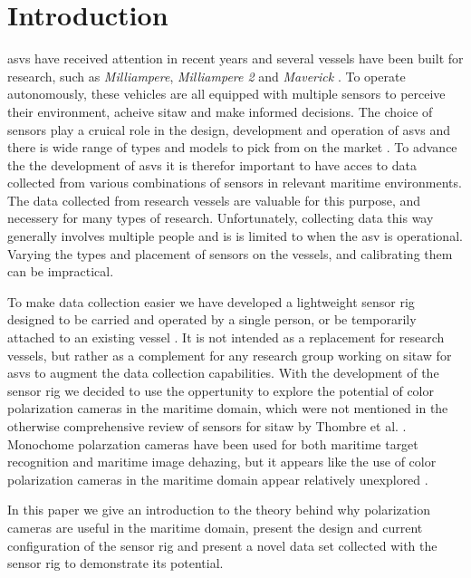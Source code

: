 \section{Introduction}
\glspl{asv} have received attention in recent years and several vessels have been built for research, such as \textit{Milliampere}, \textit{Milliampere 2} and \textit{Maverick} \cite{brekkeMilliAmpereAutonomousFerry2022}\cite{zhangDesignBuildAutonomous2023}\cite{eideAutonomousUrbanPassenger2024}.
To operate autonomously, these vehicles are all equipped with multiple sensors to perceive their environment, acheive \gls{sitaw} and make informed decisions.
The choice of sensors play a cruical role in the design, development and operation of \glspl{asv} and there is wide range of types and models to pick from on the market \cite{thombreSensorsAITechniques2022}.
To advance the the development of \glspl{asv} it is therefor important to have acces to data collected from various combinations  of sensors in relevant maritime environments.
The data collected from research vessels are valuable for this purpose, and necessery for many types of research.
Unfortunately, collecting data this way generally involves multiple people and is is limited to when the \gls{asv} is operational.
Varying the types and placement of sensors on the vessels, and calibrating them can be impractical.

To make data collection easier we have developed a lightweight sensor rig designed to be carried and operated by a single person, or be temporarily attached to an existing vessel \cite{martensPavingWayEnhanced2023}.
It is not intended as a replacement for research vessels, but rather as a complement for any research group working on \gls{sitaw} for \glspl{asv} to augment the data collection capabilities.
With the development of the sensor rig we decided to use the oppertunity to explore the potential of color polarization cameras in the maritime domain, which were not mentioned in the otherwise comprehensive review of sensors for \gls{sitaw} by Thombre et al. \cite{thombreSensorsAITechniques2022}.
Monochome polarzation cameras have been used for both maritime target recognition and maritime image dehazing, but it appears like the use of color polarization cameras in the maritime domain appear relatively unexplored \cite{zhongPolarizationintensityJointImaging2023}\cite{maPolarizationBasedMethodMaritime2024}.

In this paper we give an introduction to the theory behind why polarization cameras are useful in the maritime domain, present the design and current configuration of the sensor rig and present a novel data set collected with the sensor rig to demonstrate its potential.


